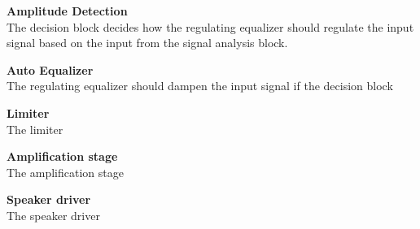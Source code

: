 \textbf{Amplitude Detection} \\
The decision block decides how the regulating equalizer should regulate the input signal based on the input from the signal analysis block. 

\textbf{Auto Equalizer} \\
The regulating equalizer should dampen the input signal if the decision block 

\textbf{Limiter} \\
The limiter

\textbf{Amplification stage} \\
The amplification stage

\textbf{Speaker driver} \\
The speaker driver

